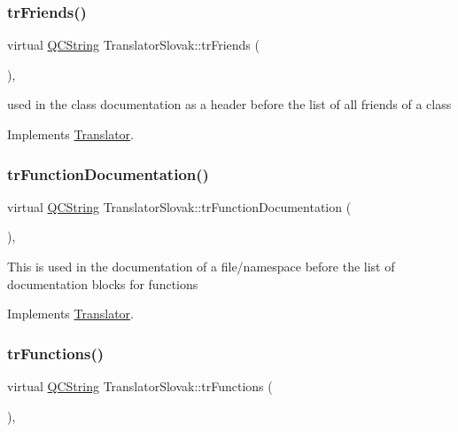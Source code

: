 \subsubsection{\texorpdfstring{trFriends()}{trFriends()}}
{\footnotesize\ttfamily virtual \mbox{\hyperlink{class_q_c_string}{Q\+C\+String}} Translator\+Slovak\+::tr\+Friends (\begin{DoxyParamCaption}{ }\end{DoxyParamCaption})\hspace{0.3cm}{\ttfamily [inline]}, {\ttfamily [virtual]}}

used in the class documentation as a header before the list of all friends of a class 

Implements \mbox{\hyperlink{class_translator}{Translator}}.

\mbox{\label{class_translator_slovak_a83c5f7c8335f8a7a2c5d60be0dc5dcc6}} 
\subsubsection{\texorpdfstring{trFunctionDocumentation()}{trFunctionDocumentation()}}
{\footnotesize\ttfamily virtual \mbox{\hyperlink{class_q_c_string}{Q\+C\+String}} Translator\+Slovak\+::tr\+Function\+Documentation (\begin{DoxyParamCaption}{ }\end{DoxyParamCaption})\hspace{0.3cm}{\ttfamily [inline]}, {\ttfamily [virtual]}}

This is used in the documentation of a file/namespace before the list of documentation blocks for functions 

Implements \mbox{\hyperlink{class_translator}{Translator}}.

\mbox{\label{class_translator_slovak_aa14d607a375a0a14e1c9ac0cbff15a04}} 
\subsubsection{\texorpdfstring{trFunctions()}{trFunctions()}}
{\footnotesize\ttfamily virtual \mbox{\hyperlink{class_q_c_string}{Q\+C\+String}} Translator\+Slovak\+::tr\+Functions (\begin{DoxyParamCaption}{ }\end{DoxyParamCaption})\hspace{0.3cm}{\ttfamily [inline]}, {\ttfamily [virtual]}}

